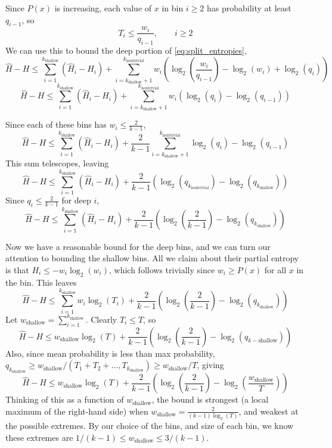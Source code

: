 \documentclass[letterpaper]{article}
\begin{document}
Since $P(x)$ is increasing, each value of $x$ in bin $i \ge 2$ has probability at least $q_{i - 1}$, so
\[T_i \le \frac{w_i}{q_{i - 1}}, \qquad i \ge 2\]
We can use this to bound the deep portion of \ref{eq:split_entropies},
\[\hat{H} - H \le \sum_{i=1}^{k_\text{shallow}}\left(\hat{H}_i - H_i\right) + \sum_{i=k_\text{shallow} + 1}^{k_\text{nontrivial}} w_i\left(\log_2\left(\frac{w_i}{q_{i - 1}}\right) - \log_2(w_i) + \log_2\left(q_i\right)\right)\]
\[\hat{H} - H \le \sum_{i=1}^{k_\text{shallow}}\left(\hat{H}_i - H_i\right) + \sum_{i=k_\text{shallow} + 1}^{k_\text{nontrivial}} w_i\left(\log_2\left(q_i\right) - \log_2\left(q_{i - 1}\right)\right)\]

Since each of these bins has $w_i \le \frac{2}{k-1}$,
\[\hat{H} - H \le \sum_{i=1}^{k_\text{shallow}}\left(\hat{H}_i - H_i\right) + \frac{2}{k-1}\sum_{i=k_\text{shallow} + 1}^{k_\text{nontrivial}} \log_2\left(q_i\right) - \log_2(q_{i - 1})\]
This sum telescopes, leaving
\[\hat{H} - H \le \sum_{i=1}^{k_\text{shallow}}\left(\hat{H}_i - H_i\right) + \frac{2}{k-1}\left(\log_2\left(q_{k_\text{nontrivial}}\right) - \log_2\left(q_{k_\text{shallow}}\right)\right)\]
Since $q_i \le \frac{2}{k-1}$ for deep $i$,
\[\hat{H} - H \le \sum_{i=1}^{k_\text{shallow}}\left(\hat{H}_i - H_i\right) + \frac{2}{k-1}\left(\log_2\left(\frac{2}{k-1}\right) - \log_2\left(q_{k_\text{shallow}}\right)\right)\]

Now we have a reasonable bound for the deep bins, and we can turn our attention to bounding the shallow bins.
All we claim about their partial entropy is that $H_i \le -w_i\log_2(w_i)$, which follows trivially since $w_i \ge P(x)$ for all $x$ in the bin.
This leaves
\[\hat{H} - H \le \sum_{i=1}^{k_\text{shallow}}w_i\log_2(T_i) + \frac{2}{k-1}\left(\log_2\left(\frac{2}{k-1}\right) - \log_2\left(q_{k_\text{shallow}}\right)\right)\]
Let $w_\text{shallow} = \sum_{i=1}^{k_\text{shallow}}$.
Clearly $T_i \le T$, so
\[\hat{H} - H \le w_\text{shallow}\log_2(T) +  \frac{2}{k-1}\left(\log_2\left(\frac{2}{k-1}\right) - \log_2\left(q_{k-\text{shallow}}\right)\right)\]
Also, since mean probability is less than max probability, $q_{k_\text{shallow}} \ge w_\text{shallow}/(T_1 + T_2 + \ldots, T_{k_\text{shallow}}) \ge w_\text{shallow}/T$, giving
\[\hat{H} - H \le w_\text{shallow}\log_2(T) +  \frac{2}{k-1}\left(\log_2\left(\frac{2}{k-1}\right) - \log_2\left(\frac{w_\text{shallow}}{T}\right)\right)\]
Thinking of this as a function of $w_\text{shallow}$, the bound is strongest (a local maximum of the right-hand side) when $w_\text{shallow} = \frac{2}{(k-1)\log_2(T)}$, and weakest at the possible extremes.
By our choice of the bins, and size of each bin, we know these extremes are $1/(k-1) \le w_\text{shallow} \le 3/(k-1)$.
\end{document}
